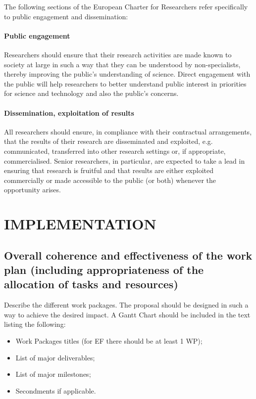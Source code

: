 \documentclass[a4paper,11pt]{article}
\begin{document}
The following sections of the European Charter for Researchers refer specifically to public engagement and dissemination:

\paragraph{Public engagement}
Researchers should ensure that their research activities are made known to society at large in such a way that they can be understood by non-specialists, thereby improving the public's understanding of science. Direct engagement with the public will help researchers to better understand public interest in priorities for science and technology and also the public's concerns. 

\paragraph{Dissemination, exploitation of results}
All researchers should ensure, in compliance with their contractual arrangements, that the results of their research are disseminated and exploited, e.g. communicated, transferred into other research settings or, if appropriate, commercialised. Senior researchers, in particular, are expected to take a lead in ensuring that research is fruitful and that results are either exploited commercially or made accessible to the public (or both) whenever the opportunity arises. 


\section{IMPLEMENTATION}
\label{sec:implementation}

\subsection{Overall coherence and effectiveness of the work plan (including appropriateness of the allocation of tasks and resources)}
\label{subsec:work_plan}

Describe the different work packages. The proposal should be designed in such a way to achieve the desired impact. A Gantt Chart should be included in the text listing the following:
\begin{itemize}
\item Work Packages titles (for EF there should be at least 1 WP); 
\item List of major deliverables;    
\item List of major milestones;  
\item Secondments if applicable.
\end{itemize}
\end{document}
